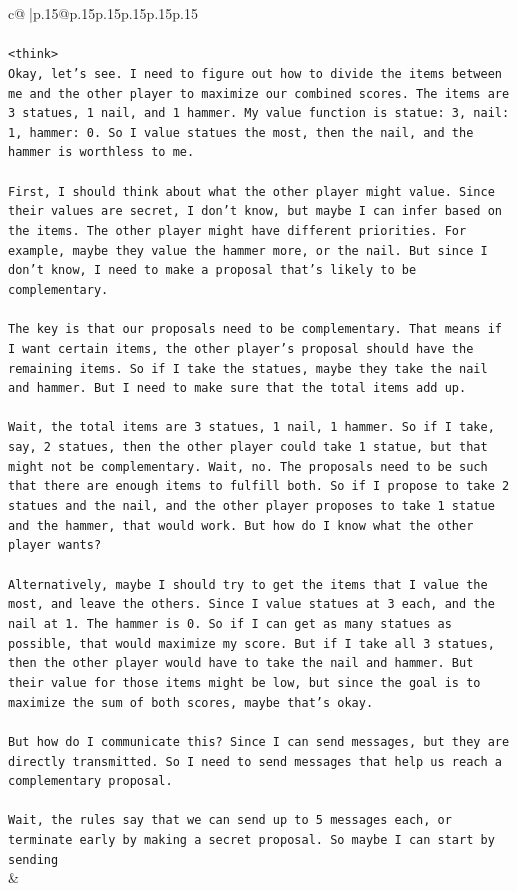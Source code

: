 \documentclass{article}
\begin{document}
{\begin{supertabular}{c@{$\;$}|p{.15\linewidth}@{}p{.15\linewidth}p{.15\linewidth}p{.15\linewidth}p{.15\linewidth}p{.15\linewidth}}
{{{\\ 
\\ 
\texttt{<think>} \\
\texttt{Okay, let's see. I need to figure out how to divide the items between me and the other player to maximize our combined scores. The items are 3 statues, 1 nail, and 1 hammer. My value function is statue: 3, nail: 1, hammer: 0. So I value statues the most, then the nail, and the hammer is worthless to me.} \\
\\ 
\texttt{First, I should think about what the other player might value. Since their values are secret, I don't know, but maybe I can infer based on the items. The other player might have different priorities. For example, maybe they value the hammer more, or the nail. But since I don't know, I need to make a proposal that's likely to be complementary.} \\
\\ 
\texttt{The key is that our proposals need to be complementary. That means if I want certain items, the other player's proposal should have the remaining items. So if I take the statues, maybe they take the nail and hammer. But I need to make sure that the total items add up.} \\
\\ 
\texttt{Wait, the total items are 3 statues, 1 nail, 1 hammer. So if I take, say, 2 statues, then the other player could take 1 statue, but that might not be complementary. Wait, no. The proposals need to be such that there are enough items to fulfill both. So if I propose to take 2 statues and the nail, and the other player proposes to take 1 statue and the hammer, that would work. But how do I know what the other player wants?} \\
\\ 
\texttt{Alternatively, maybe I should try to get the items that I value the most, and leave the others. Since I value statues at 3 each, and the nail at 1. The hammer is 0. So if I can get as many statues as possible, that would maximize my score. But if I take all 3 statues, then the other player would have to take the nail and hammer. But their value for those items might be low, but since the goal is to maximize the sum of both scores, maybe that's okay.} \\
\\ 
\texttt{But how do I communicate this? Since I can send messages, but they are directly transmitted. So I need to send messages that help us reach a complementary proposal.} \\
\\ 
\texttt{Wait, the rules say that we can send up to 5 messages each, or terminate early by making a secret proposal. So maybe I can start by sending} \\
            }
        }
    }
    & \\ \\


\end{supertabular}}
\end{document}
